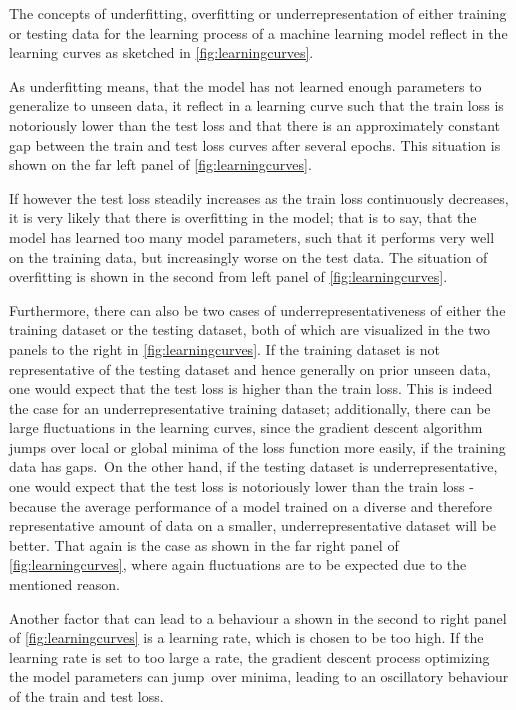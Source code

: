 \documentclass[a4paper,12pt]{report}
\begin{document}
The concepts of underfitting, overfitting or underrepresentation of either training or testing data for the learning process of a machine learning model reflect in the learning curves as sketched in \cref{fig:learningcurves}. 

As underfitting means, that the model has not learned enough parameters to generalize to unseen data, it reflect in a learning curve such that the train loss is notoriously lower than the test loss and that there is an approximately constant gap between the train and test loss curves after several epochs. This situation is shown on the far left panel of \cref{fig:learningcurves}. 

If however the test loss steadily increases as the train loss continuously decreases, it is very likely that there is overfitting in the model; that is to say, that the model has learned too many model parameters, such that it performs very well on the training data, but increasingly worse on the test data. The situation of overfitting is shown in the second from left panel of \cref{fig:learningcurves}. 

Furthermore, there can also be two cases of underrepresentativeness of either the training dataset or the testing dataset, both of which are visualized in the two panels to the right in \cref{fig:learningcurves}. If the training dataset is not representative of the testing dataset and hence generally on prior unseen data, one would expect that the test loss is higher than the train loss. This is indeed the case for an underrepresentative training dataset; additionally, there can be large fluctuations in the learning curves, since the gradient descent algorithm jumps over local or global minima of the loss function more easily, if the training data has \flqq gaps\frqq.\ On the other hand, if the testing dataset is underrepresentative, one would expect that the test loss is notoriously lower than the train loss - because the average performance of a model trained on a diverse and therefore representative amount of data on a smaller, underrepresentative dataset will be better. That again is the case as shown in the far right panel of \cref{fig:learningcurves}, where again fluctuations are to be expected due to the mentioned reason. 

Another factor that can lead to a behaviour a shown in the second to right panel of \cref{fig:learningcurves} is a learning rate, which is chosen to be too high. If the learning rate is set to too large a rate, the gradient descent process optimizing the model parameters can \flqq jump\frqq\ over minima, leading to an oscillatory behaviour of the train and test loss.
\end{document}
